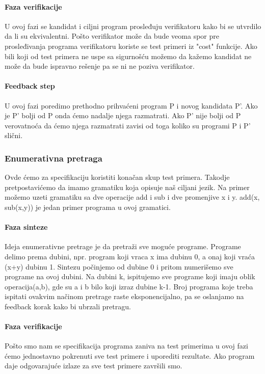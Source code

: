 \paragraph{Faza verifikacije}

U ovoj fazi se kandidat i ciljni program prosleđuju verifikatoru kako bi se utvrdilo da li su ekvivalentni. Pošto verifikator može da bude veoma spor pre prosleđivanja programa verifikatoru koriste se test primeri iz "cost" funkcije. Ako bili koji od test primera ne uspe sa sigurnošću možemo da kažemo kandidat ne može da bude ispravno rešenje pa se ni ne poziva verifikator.

\paragraph{Feedback step}

U ovoj fazi poredimo prethodno prihvaćeni program P i novog kandidata P'. Ako je P' bolji od P onda ćemo nadalje njega razmatrati. Ako P' nije bolji od P verovatnoća da ćemo njega razmatrati zavisi od toga koliko su programi P i P' slični.

\subsubsection{Enumerativna pretraga}
\label{subsec:enumerativnaPretraga}

Ovde ćemo za specifikaciju koristiti konačan skup test primera. Takodje pretpostavićemo da imamo gramatiku koja opisuje naš ciljani jezik. Na primer možemo uzeti gramatiku sa dve operacije add i sub i dve promenjive x i y. add(x, sub(x,y)) je jedan primer programa u ovoj gramatici.

\paragraph{Faza sinteze}

Ideja enumerativne pretrage je da pretraži sve moguće programe. Programe delimo prema dubini, npr. program koji vraca x ima dubinu 0, a onaj koji vraća (x+y) dubinu 1.
Sintezu počinjemo od dubine 0 i pritom numerišemo sve programe na ovoj dubini. Na dubini k, ispitujemo sve programe koji imaju oblik operacija(a,b), gde su a i b bilo koji izraz dubine k-1. Broj programa koje treba ispitati ovakvim načinom pretrage raste eksponencijalno, pa se oslanjamo na feedback korak kako bi ubrzali pretragu.

\paragraph{Faza verifikacije}
Pošto smo nam se specifikacija programa zaniva na test primerima u ovoj fazi ćemo jednostavno pokrenuti sve test primere i uporediti rezultate. Ako program daje odgovarajuće izlaze za sve test primere završili smo.

